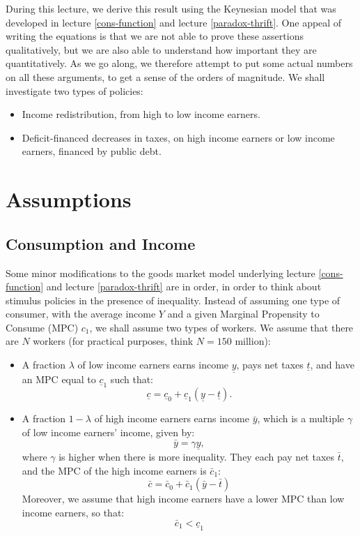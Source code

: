 \documentclass[]{book}
\theoremstyle{definition}
\theoremstyle{definition}
\theoremstyle{definition}
\theoremstyle{remark}
\begin{document}
During this lecture, we derive this result using the Keynesian model
that was developed in lecture \ref{cons-function} and lecture
\ref{paradox-thrift}. One appeal of writing the equations is that we are
not able to prove these assertions qualitatively, but we are also able
to understand how important they are quantitatively. As we go along, we
therefore attempt to put some actual numbers on all these arguments, to
get a sense of the orders of magnitude. We shall investigate two types
of policies:

\begin{itemize}
\item
  Income redistribution, from high to low income earners.
\item
  Deficit-financed decreases in taxes, on high income earners or low
  income earners, financed by public debt.
\end{itemize}

\section{Assumptions}\label{assumptions-3}

\subsection{Consumption and Income}\label{consumption-and-income}

Some minor modifications to the goods market model underlying lecture
\ref{cons-function} and lecture \ref{paradox-thrift} are in order, in
order to think about stimulus policies in the presence of inequality.
Instead of assuming one type of consumer, with the average income \(Y\)
and a given Marginal Propensity to Consume (MPC) \(c_{1}\), we shall
assume two types of workers. We assume that there are \(N\) workers (for
practical purposes, think \(N=150\) million):

\begin{itemize}
\item
  A fraction \(\lambda\) of low income earners earns income
  \(\underline{y}\), pays net taxes \(\underline{t}\), and have an MPC
  equal to \(\underline{c}_{1}\) such that:
  \[\underline{c}=\underline{c}_{0}+\underline{c}_{1}(\underline{y}-\underline{t}).\]
\item
  A fraction \(1-\lambda\) of high income earners earns income
  \(\bar{y}\), which is a multiple \(\gamma\) of low income earners'
  income, given by: \[\bar{y}=\gamma\underline{y},\] where \(\gamma\) is
  higher when there is more inequality. They each pay net taxes
  \(\bar{t}\), and the MPC of the high income earners is
  \(\bar{c}_{1}\): \[\bar{c}=\bar{c}_{0}+\bar{c}_{1}(\bar{y}-\bar{t})\]
  Moreover, we assume that high income earners have a lower MPC than low
  income earners, so that: \[\bar{c}_{1}<\underline{c}_{1}\]
\end{itemize}
\end{document}

